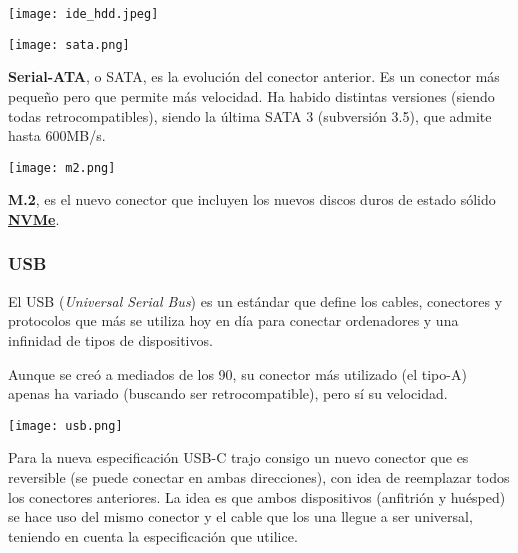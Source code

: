 \begin{center}
    \texttt{[image: ide\_hdd.jpeg]}
\end{center}


\begin{minipage}{0.15\linewidth}
    \texttt{[image: sata.png]}
\end{minipage}
\hfill
\begin{minipage}{0.8\linewidth}
    \textbf{Serial-ATA}, o SATA, es la evolución del conector anterior. Es un conector más pequeño pero que permite más velocidad. Ha habido distintas versiones (siendo todas retrocompatibles), siendo la última SATA 3 (subversión 3.5), que admite hasta 600MB/s.
\end{minipage}


\begin{minipage}{0.15\linewidth}
    \texttt{[image: m2.png]}
\end{minipage}
\hfill
\begin{minipage}{0.8\linewidth}
    \textbf{M.2}, es el nuevo conector que incluyen los nuevos discos duros de estado sólido \textbf{\hyperlink{nvme}{NVMe}}.
\end{minipage}


\subsubsection{USB}

El USB (\textit{Universal Serial Bus}) es un estándar que define los cables, conectores y protocolos que más se utiliza hoy en día para conectar ordenadores y una infinidad de tipos de dispositivos.

Aunque se creó a mediados de los 90, su conector más utilizado (el tipo-A) apenas ha variado (buscando ser retrocompatible), pero sí su velocidad.

\begin{center}
    \texttt{[image: usb.png]}
    \vspace{-5pt}
\end{center}

\vspace{-10pt}
Para la nueva especificación USB-C trajo consigo un nuevo conector que es reversible (se puede conectar en ambas direcciones), con idea de reemplazar todos los conectores anteriores. La idea es que ambos dispositivos (anfitrión y huésped) se hace uso del mismo conector y el cable que los una llegue a ser universal, teniendo en cuenta la especificación que utilice.

